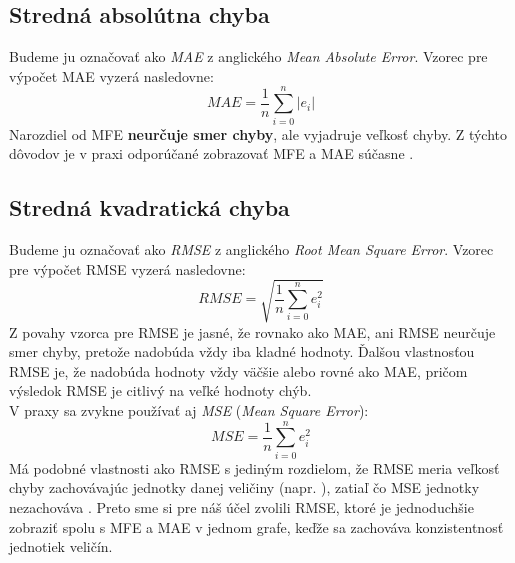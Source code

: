 \subsection{Stredná absolútna chyba}
Budeme ju označovať ako \textit{MAE} z anglického \textit{Mean Absolute Error}. Vzorec pre výpočet MAE vyzerá nasledovne:
\[
	MAE = \frac{1}{n}\sum\limits_{i=0}^{n} \lvert e_i \rvert 
\]
Narozdiel od MFE \textbf{neurčuje smer chyby}, ale vyjadruje veľkosť chyby. Z týchto dôvodov je v praxi odporúčané zobrazovať MFE a MAE súčasne \cite{RecommendOnVerif}. 

\subsection{Stredná kvadratická chyba}
Budeme ju označovať ako \textit{RMSE} z anglického \textit{Root Mean Square Error}. Vzorec pre výpočet RMSE vyzerá nasledovne:
\[
	RMSE = \sqrt{ \frac{1}{n}\sum\limits_{i=0}^{n} e_i^{2}  }
\]
Z povahy vzorca pre RMSE je jasné, že rovnako ako MAE, ani RMSE neurčuje smer chyby, pretože nadobúda vždy iba kladné hodnoty. 
Ďalšou vlastnosťou RMSE je, že nadobúda hodnoty vždy väčšie alebo rovné ako MAE, pričom výsledok RMSE je citlivý na veľké hodnoty chýb. \\
\label{subsec:mse}
V praxy sa zvykne používať aj \textit{MSE} (\textit{Mean Square Error}):
\[
	MSE = \frac{1}{n}\sum\limits_{i=0}^{n} e_i^{2} 
\]
Má podobné vlastnosti ako RMSE s jediným rozdielom, že RMSE meria veľkosť chyby zachovávajúc jednotky danej veličiny (napr. \textcelsius), zatiaľ čo MSE jednotky nezachováva \cite{RecommendOnVerif}. Preto sme si pre náš účel zvolili RMSE, ktoré je jednoduchšie zobraziť spolu s MFE a MAE v jednom grafe, keďže sa zachováva konzistentnosť jednotiek veličín.





